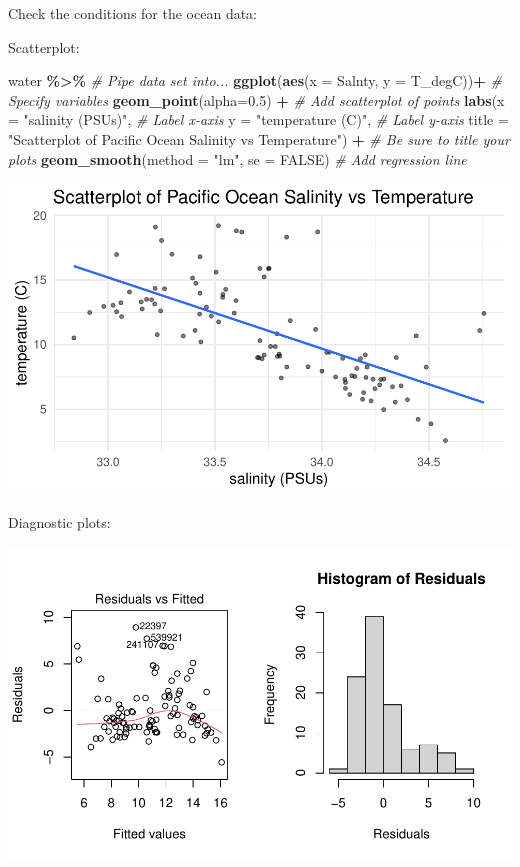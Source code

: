 \documentclass[
]{report}
\newenvironment{Shaded}{\begin{snugshade}}{\end{snugshade}}
\newcommand{\AttributeTok}[1]{\textcolor[rgb]{0.13,0.29,0.53}{#1}}
\newcommand{\CommentTok}[1]{\textcolor[rgb]{0.56,0.35,0.01}{\textit{#1}}}
\newcommand{\ConstantTok}[1]{\textcolor[rgb]{0.56,0.35,0.01}{#1}}
\newcommand{\FloatTok}[1]{\textcolor[rgb]{0.00,0.00,0.81}{#1}}
\newcommand{\FunctionTok}[1]{\textcolor[rgb]{0.13,0.29,0.53}{\textbf{#1}}}
\newcommand{\NormalTok}[1]{#1}
\newcommand{\SpecialCharTok}[1]{\textcolor[rgb]{0.81,0.36,0.00}{\textbf{#1}}}
\newcommand{\StringTok}[1]{\textcolor[rgb]{0.31,0.60,0.02}{#1}}
\begin{document}
Check the conditions for the ocean data:

Scatterplot:

\begin{Shaded}
\begin{Highlighting}[]
\NormalTok{water }\SpecialCharTok{\%\textgreater{}\%} \CommentTok{\# Pipe data set into...}
\FunctionTok{ggplot}\NormalTok{(}\FunctionTok{aes}\NormalTok{(}\AttributeTok{x =}\NormalTok{ Salnty, }\AttributeTok{y =}\NormalTok{ T\_degC))}\SpecialCharTok{+}  \CommentTok{\# Specify variables}
  \FunctionTok{geom\_point}\NormalTok{(}\AttributeTok{alpha=}\FloatTok{0.5}\NormalTok{) }\SpecialCharTok{+}  \CommentTok{\# Add scatterplot of points}
  \FunctionTok{labs}\NormalTok{(}\AttributeTok{x =} \StringTok{"salinity (PSUs)"}\NormalTok{,  }\CommentTok{\# Label x{-}axis}
       \AttributeTok{y =} \StringTok{"temperature (C)"}\NormalTok{,  }\CommentTok{\# Label y{-}axis}
       \AttributeTok{title =} \StringTok{"Scatterplot of Pacific Ocean Salinity vs Temperature"}\NormalTok{) }\SpecialCharTok{+} 
               \CommentTok{\# Be sure to title your plots}
  \FunctionTok{geom\_smooth}\NormalTok{(}\AttributeTok{method =} \StringTok{"lm"}\NormalTok{, }\AttributeTok{se =} \ConstantTok{FALSE}\NormalTok{)  }\CommentTok{\# Add regression line}
\end{Highlighting}
\end{Shaded}

\begin{center}\includegraphics[width=0.7\linewidth]{13-VN13-regression_files/figure-latex/unnamed-chunk-20-1} \end{center}

\newpage

Diagnostic plots:

\begin{center}\includegraphics[width=0.7\linewidth]{13-VN13-regression_files/figure-latex/unnamed-chunk-21-1} \end{center}
\end{document}
